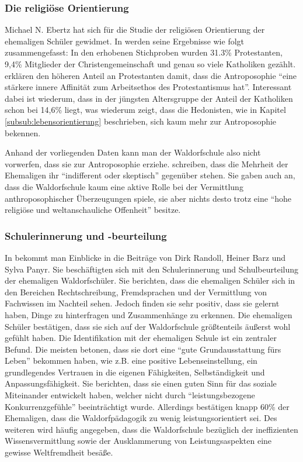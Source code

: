 \subsubsection{Die religiöse Orientierung}

Michael N. Ebertz hat sich für die Studie der religiösen Orientierung der ehemaligen Schüler gewidmet. 
In \citet[][S. 18f]{randoll07} werden seine Ergebnisse wie folgt zusammengefasst: In den erhobenen Stichproben wurden 31.3\% Protestanten, 9,4\% Mitglieder der Christengemeinschaft und genau so viele Katholiken gezählt. 
\citet[][S. 18]{randoll07} erklären den höheren Anteil an Protestanten damit, dass die Antroposophie \enquote{eine stärkere innere Affinität zum Arbeitsethos des Protestantismus hat}. 
Interessant dabei ist wiederum, dass in der jüngsten Altersgruppe der Anteil der Katholiken schon bei 14,6\% liegt, was wiederum zeigt, dass die Hedonisten, wie in Kapitel \ref{subsub:lebensorientierung} beschrieben, sich kaum mehr zur Antroposophie bekennen. 

Anhand der vorliegenden Daten kann man der Waldorfschule also nicht vorwerfen, dass sie zur Antroposophie erziehe. 
\citet[][S. 19]{randoll07} schreiben, dass die Mehrheit der Ehemaligen ihr \enquote{indifferent oder skeptisch} gegenüber stehen. 
Sie gaben auch an, dass die Waldorfschule kaum eine aktive Rolle bei der Vermittlung anthroposophischer Überzeugungen spiele, sie aber nichts desto trotz eine \enquote{hohe religiöse und weltanschauliche Offenheit} besitze.

\subsubsection{Schulerinnerung und -beurteilung}
\label{subsub:Erinnerung}

In \citet[][S. 19f]{randoll07} bekommt man Einblicke in die Beiträge von Dirk Randoll, Heiner Barz und Sylva Panyr. 
Sie beschäftigten sich mit den Schulerinnerung und Schulbeurteilung der ehemaligen Waldorfschüler. 
Sie berichten, dass die ehemaligen Schüler sich in den Bereichen Rechtschreibung, Fremdsprachen und der Vermittlung von Fachwissen im Nachteil sehen. 
Jedoch finden sie sehr positiv, dass sie gelernt haben, Dinge zu hinterfragen und Zusammenhänge zu erkennen. 
Die ehemaligen Schüler bestätigen, dass sie sich auf der Waldorfschule größtenteils äußerst wohl gefühlt haben. 
Die Identifikation mit der ehemaligen Schule ist ein zentraler Befund. 
Die meisten betonen, dass sie dort eine \enquote{gute Grundausstattung fürs Leben} bekommen haben, wie z.B. eine positive Lebenseinstellung, ein grundlegendes Vertrauen in die eigenen Fähigkeiten, Selbständigkeit und Anpassungsfähigkeit. 
Sie berichten, dass sie einen guten Sinn für das soziale Miteinander entwickelt haben, welcher nicht durch \enquote{leistungsbezogene Konkurrenzgefühle} beeinträchtigt wurde. 
Allerdings bestätigen knapp 60\% der Ehemaligen, dass die Waldorfpädagogik zu wenig leistungsorientiert sei. 
Des weiteren wird häufig angegeben, dass die Waldorfschule bezüglich der ineffizienten Wissensvermittlung sowie der Ausklammerung von Leistungsaspekten eine gewisse Weltfremdheit besäße. 

